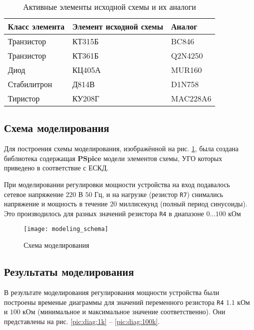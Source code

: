 \begin{table}[H]
\begin{center}
	\caption{Активные элементы исходной схемы и их аналоги}
	\label{tab:elements_analogs}
	\def\tabcolsep{10pt}
	\begin{tabular}{|l|l|l|}
		\hline
		Класс элемента &
		Элемент исходной схемы & 
		Аналог \\
		\hline
		Транзистор &
		КТ315Б &
		BC846 \\
		\hline
		Транзистор &
		КТ361Б &
		Q2N4250 \\
		\hline
		Диод &
		КЦ405А &
		MUR160 \\
		\hline
		Стабилитрон &
		Д814В &
		D1N758 \\
		\hline
		Тиристор &
		КУ208Г &
		MAC228A6 \\
		\hline
\end{tabular}
\end{center}
\end{table}

\subsection{Схема моделирования}

Для построения схемы моделирования, изображённой на рис. \ref{pic:mod_scheme}, была создана библиотека содержащая \textbf{PSpice} модели элементов схемы, УГО которых приведено  в соответствие с ЕСКД. 

При моделировании регулировки мощности устройства на вход подавалось сетевое напряжение $220$ В $50$ Гц, и на нагрузке (резистор \verb+R7+) снимались напряжение и мощность в течение $20$ миллисекунд (полный период синусоиды). Это производилось для разных значений резистора \verb+R4+ в диапазоне $0\dots100$ кОм

\begin{figure}[H]
\begin{center}
	\texttt{[image: modeling\_schema]}
	\caption{Схема моделирования}
	\label{pic:mod_scheme}
\end{center}
\end{figure}

\subsection{Результаты моделирования}

В результате моделирования регулирования мощности устройства были построены временые диаграммы для значений переменного резистора \verb+R4+ $1.1$ кОм и $100$ кОм (минимальное и максимальное значение соответственно). Они представлены на рис. \ref{pic:diag:1k} -- \ref{pic:diag:100k}.

